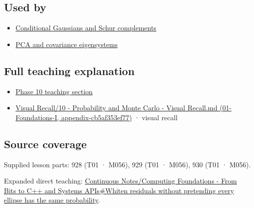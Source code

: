\subsection{Used by}\label{used-by}

\begin{itemize}
\tightlist
\item
  \hyperref[appendix-f0437ea55a47]{Conditional Gaussians and Schur complements}
\item
  \hyperref[appendix-ad175ef3c5bf]{PCA and covariance eigensystems}
\end{itemize}

\subsection{Full teaching explanation}\label{full-teaching-explanation}

\begin{itemize}
\tightlist
\item
  \href{Continuous\%20Notes/Computing\%20Foundations\%20-\%20From\%20Bits\%20to\%20C++\%20and\%20Systems\%20APIs\#5.\%20Waiting\%20times,\%20event\%20counts,\%20and\%20covariance\%20geometry}{Phase 10 teaching section}
\item
  \href{}{Visual Recall/10 - Probability and Monte Carlo - Visual Recall.md (01-Foundations-I, appendix-cb5af353ef77)} · visual recall
\end{itemize}

\subsection{Source coverage}\label{source-coverage}

Supplied lesson parts: 928 (T01 · M056), 929 (T01 · M056), 930 (T01 · M056).

Expanded direct teaching: \href{Continuous\%20Notes/Computing\%20Foundations\%20-\%20From\%20Bits\%20to\%20C++\%20and\%20Systems\%20APIs\#Whiten\%20residuals\%20without\%20pretending\%20every\%20ellipse\%20has\%20the\%20same\%20probability}{Continuous Notes/Computing Foundations - From Bits to C++ and Systems APIs\#Whiten residuals without pretending every ellipse has the same probability}.

